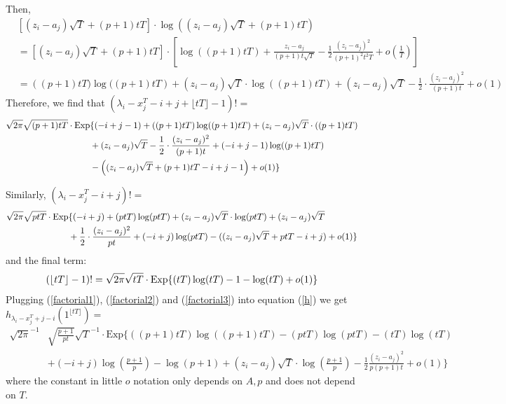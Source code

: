Then, 
\begin{align*}
	& \left[(z_{i}-a_{j})\sqrt{T}+(p+1)tT\right]\cdot \log\left((z_{i}-a_{j})\sqrt{T}+(p+1)tT\right)\\
	&=\left[(z_{i}-a_{j})\sqrt{T}+(p+1)tT\right]\cdot \left[\log((p+1)tT)+\frac{z_{i}-a_{j}}{(p+1)t\sqrt{T}}-\frac{1}{2}\frac{(z_{i}-a_{j})^2}{(p+1)^{2}t^{2}T}+o(\frac{1}{T})\right]\\
	&=\left((p+1)tT)\log((p+1)tT\right)+(z_{i}-a_{j})\sqrt{T}\cdot \log((p+1)tT)+(z_{i}-a_{j})\sqrt{T}-\frac{1}{2}\cdot\frac{(z_{i}-a_{j})^2}{(p+1)t}+o(1)
\end{align*}
Therefore, we find that $(\lambda_{i}-x_{j}^{T}-i+j+\lfloor tT \rfloor -1)!=$
\begin{equation}{\label{factorial1}}
\begin{split}
	\sqrt{2\pi}\sqrt{(p+1)tT}\cdot \text{Exp}&\{(-i+j-1) + ((p+1)tT)\log((p+1)tT)+(z_{i}-a_{j})\sqrt{T}\cdot ((p+1)tT)\\
	&+(z_{i}-a_{j})\sqrt{T}-\frac{1}{2}\cdot\frac{(z_{i}-a_{j})^2}{(p+1)t}+(-i+j-1)\log((p+1)tT)\\&-\left((z_{i}-a_{j})\sqrt{T} + (p+1)tT-i+j-1\right)+o(1)\}
\end{split}
\end{equation}

Similarly, $(\lambda_{i}-x_{j}^{T}-i+j)!=$
\begin{align}{\label{factorial2}}
\begin{split}
\sqrt{2\pi}\sqrt{ptT}\cdot \text{Exp}&\{(-i+j) + (ptT)\log(ptT)+(z_{i}-a_{j})\sqrt{T}\cdot \log(ptT)+(z_{i}-a_{j})\sqrt{T}\\
& +\frac{1}{2}\cdot\frac{(z_{i}-a_{j})^2}{pt}+(-i+j)\log(ptT)-((z_{i}-a_{j})\sqrt{T} + ptT-i+j)+o(1)\}	
\end{split}
\end{align} and the final term:
\begin{align}{\label{factorial3}}
	(\lfloor tT \rfloor-1)!= \sqrt{2\pi}\sqrt{tT}\cdot \text{Exp}\{(tT)\log(tT)-1-\log(tT)+o(1)\}
\end{align}
Plugging (\ref{factorial1}), (\ref{factorial2}) and (\ref{factorial3}) into equation (\ref{h}) we get $h_{\lambda_{i}-x^{T}_{j}+j-i}(1^{\lfloor tT \rfloor})=$
\begin{align*}
	\sqrt{2\pi}^{-1} & \sqrt{\frac{p+1}{pt}}\sqrt{T}^{-1}\cdot\text{Exp}\bigg\{((p+1)tT)\log((p+1)tT)-(ptT)\log(ptT)-(tT)\log(tT)\\
	& +(-i+j)\log(\frac{p+1}{p})-\log(p+1)+(z_{i}-a_{j})\sqrt{T}\cdot \log(\frac{p+1}{p})-\frac{1}{2}\frac{(z_{i}-a_{j})^{2}}{p(p+1)t}+o(1)\bigg\}
\end{align*}
where the constant in little $o$ notation only depends on $A,p$ and does not depend on $T$.



